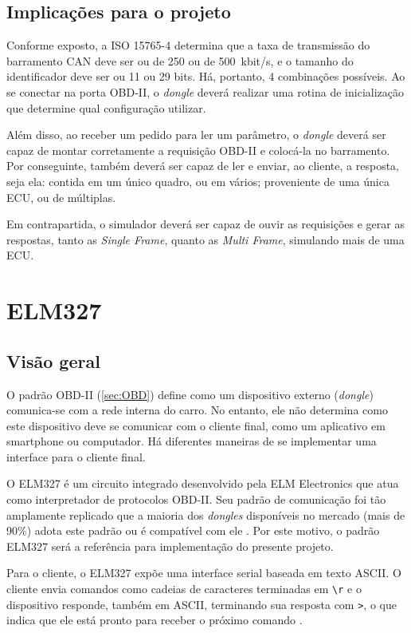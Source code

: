 \subsection{Implicações para o projeto}

Conforme exposto, a ISO 15765-4 determina que a taxa de transmissão do barramento CAN deve ser ou de 250 ou de 500~kbit/s, e o tamanho do identificador deve ser ou 11 ou 29 bits. Há, portanto, 4 combinações possíveis. Ao se conectar na porta OBD-II, o \textit{dongle} deverá realizar uma rotina de inicialização que determine qual configuração utilizar.

Além disso, ao receber um pedido para ler um parâmetro, o \textit{dongle} deverá ser capaz de montar corretamente a requisição OBD-II e colocá-la no barramento. Por conseguinte, também deverá ser capaz de ler e enviar, ao cliente, a resposta, seja ela: contida em um único quadro, ou em vários; proveniente de uma única ECU, ou de múltiplas.

Em contrapartida, o simulador deverá ser capaz de ouvir as requisições e gerar as respostas, tanto as \textit{Single Frame}, quanto as \textit{Multi Frame}, simulando mais de uma ECU.

\section{ELM327} \label{sec:ELM}

\subsection{Visão geral}
O padrão OBD-II (\autoref{sec:OBD}) define como um dispositivo externo (\textit{dongle}) comunica-se com a rede interna do carro. No entanto, ele não determina como este dispositivo deve se comunicar com o cliente final, como um aplicativo em smartphone ou computador. Há diferentes maneiras de se implementar uma interface para o cliente final.

O ELM327 é um circuito integrado desenvolvido pela ELM Electronics que atua como interpretador de protocolos OBD-II. Seu padrão de comunicação foi tão amplamente replicado que a maioria dos \textit{dongles} disponíveis no mercado (mais de 90\%) adota este padrão ou é compatível com ele \cite{wen2020plugnpwned}. Por este motivo, o padrão ELM327 será a referência para implementação do presente projeto.

Para o cliente, o ELM327 expõe uma interface serial baseada em texto ASCII. O cliente envia comandos como cadeias de caracteres terminadas em \texttt{\textbackslash r} e o dispositivo responde, também em ASCII, terminando sua resposta com \texttt{>}, o que indica que ele está pronto para receber o próximo comando \cite{elm327datasheet}.

